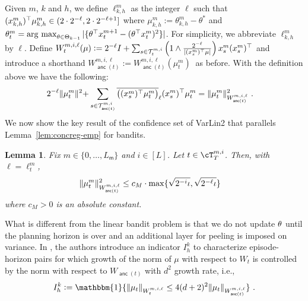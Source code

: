 \documentclass{article}
\newtheorem{lemma}{Lemma}
\def\one{\mathbbm{1}}
\def\clip#1{\wbar{\del{#1}}}
\DeclareMathOperator{\anc}{\mathsf{anc}}
\def\sfm{\mathsf{m}}
\newcommand{\blue}[1]{{\color[rgb]{.3,.5,1}#1}}
\newcommand{\kj}[1]{{\color{Magenta}[KJ: #1]}}
\renewcommand{\blue}[1]{#1}
\begin{document}
Given $m$, $k$ and $h$, we define $\blue{\ell_{k,h}^m}$ as the integer $\ell$ such that $ (x_{k,h}^m)^{\top}\mu_{k,h}^m \in \lparen 2\cdot 2^{-\ell}, 2\cdot 2^{-\ell+1}\rbrack$ where $\mu_{k,h}^m:=\theta_{k,h}^m -\theta^*$ and ${\theta}_t^m=\operatorname*{arg~max}_{{\theta} \in {{\Theta}}_{k-1}} |\{{\theta}^{\top} x_t^{m+1}-({\theta}^{\top} x_t^{m})^2\}|$. 
For simplicity, we abbreviate $\ell_{k,h}^m$ by $\ell$. %
Define $\blue{W_t^{m,i,\ell}(\mu)} 
    := 2^{-\ell}  I + \sum_{s\in \mathcal{T}_{t}^{m,i}} \del{1\wedge \fr{2^{-\ell}}{{|(x_s^{m})^\T\mu|}}} x_s^m (x_s^m)^\top$
and introduce a shorthand $\blue{ W_{\anc(t)}^{m,i,\ell}} := W_{\anc(t)}^{m,i,\ell}(\mu_{t}^m)~$ as before. With the definition above we have the following:
\begin{align*}
    2^{-\ell}  \|\mu_{t}^m \|^{2} + &\sum_{s\in \mathcal{T}_{\anc(t)}^{m,i}} \clip{(x_{s}^m)^\top\mu_{t}^m}_\ell (x_{s}^m)^\top\mu_{t}^m 
    =  \|\mu_{t}^m\|^2_{W_{{\anc}(t)}^{m,i,\ell}}~.
\end{align*}
We now show the key result of the confidence set of VarLin2 that parallels Lemma~\ref{lem:concreg-emp} for bandits.
\begin{lemma}\label{lem:concreg-emp-rl}
 Fix $m\in\{0,\ldots,L_\sfm\}$ and $i\in[L]$.
 Let $t \in \cT^{m,i}_T$.
 Then, with $\ell = \ell^m_t$,
       \begin{align*}
        \|\mu_{t}^m\|_{W_{\anc(t)}^{m,i,\ell}}^2 &\le c_M \cd  \max\{\sqrt{2^{-i}\iota},\sqrt{2^{-\ell}\iota}\}
        \end{align*}
      where $c_M>0$ is an absolute constant.
\end{lemma}
What is different from the linear bandit problem is that we do not update ${\theta}$ until the planning horizon is over and an additional layer for peeling is imposed on variance. 
In \cite{zhang21variance}, the authors introduce an indicator $I_h^k$ to characterize episode-horizon pairs for which growth of the norm of $\mu$ with respect to $W_{t}$ is controlled by the norm with respect to $W_{\anc(t)}$ with $d^2$ growth rate, i.e., 
\begin{align*}
  I_h^k:= \one\{ \|\mu_t\|_{W_{t}^{m,i,\ell}} \le 4(d+2)^2 \|\mu_t\|_{W_{\anc(t)}^{m,i,\ell}}\}~.
\end{align*}
\end{document}
